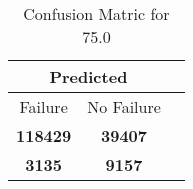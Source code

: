 \begin{table}[] 
\caption{Confusion Matric for 75.0} 
\label{Table: Prediction Accuracy-None75.0DecisionTrees100EKF-ignoreReflection-Reflection} 
\centering 
\begin{tabular} 
 {@{}ccc@{}} 
\toprule 
\multicolumn{2}{c}{\textbf{Predicted}}
 \\ \midrule 
\multicolumn{1}{|c|}{Failure} & 
\multicolumn{1}{c|}{No Failure}
 \\ \midrule 
\multicolumn{1}{|c|}{\color{green}\textbf{118429}} & 
\multicolumn{1}{c|}{\color{green}\textbf{39407}}
 \\ \midrule 
\multicolumn{1}{|c|}{\color{red}\textbf{3135}} & 
\multicolumn{1}{c|}{\color{red}\textbf{9157}}
 \\ \bottomrule 
\end{tabular} 
\end{table} 
